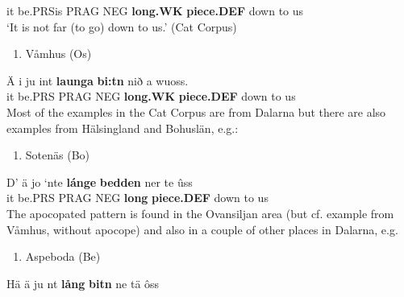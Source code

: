 it  be.PRSis  PRAG  NEG  \textbf{long.WK} \textbf{piece.DEF} down  to  us\\ %


‘It is not far (to go) down to us.’ (Cat Corpus)
\z


\begin{enumerate} %
\item 
Våmhus (Os) 

\end{enumerate} %
\ea\label{}
\gll Ä  i  ju  int  \textbf{launga} \textbf{bi:tn} nið  a  wuoss.\\


it  be.PRS  PRAG  NEG  \textbf{long.WK} \textbf{piece.DEF} down  to  us\\ %


Most of the examples in the Cat Corpus are from Dalarna but there are also examples from Hälsingland and Bohuslän, e.g.:


\begin{enumerate} %
\item 
Sotenäs (Bo)

\end{enumerate} %
\ea\label{}
\gll D’  ä  jo  ‘nte  \textbf{lánge} \textbf{bedden} ner  te  ûss\\


it  be.PRS  PRAG  NEG  \textbf{long} \textbf{piece.DEF} down  to  us\\ %


The apocopated pattern is found in the Ovansiljan area (but cf. example from Våmhus, without apocope) and also in a couple of other places in Dalarna, e.g.


\begin{enumerate} %
\item 
Aspeboda (Be)

\end{enumerate} %
\ea\label{}
\gll Hä  ä  ju  nt  \textbf{lång} \textbf{bitn} ne  tä  ôss\\


